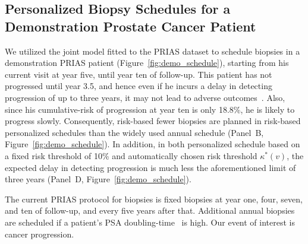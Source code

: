 \subsection{Personalized Biopsy Schedules for a Demonstration Prostate Cancer Patient}
We utilized the joint model fitted to the PRIAS dataset to schedule biopsies in a demonstration PRIAS patient (Figure~\ref{fig:demo_schedule}), starting from his current visit at year five, until year ten of follow-up. This patient has not progressed until year 3.5, and hence even if he incurs a delay in detecting progression of up to three years, it may not lead to adverse outcomes~\citep{carvalho}. Also, since his cumulative-risk of progression at year ten is only 18.8\%, he is likely to progress slowly. Consequently, risk-based fewer biopsies are planned in risk-based personalized schedules than the widely used annual schedule (Panel~B, Figure~\ref{fig:demo_schedule}). In addition, in both personalized schedule based on a fixed risk threshold of 10\% and automatically chosen risk threshold $\kappa^*(v)$, the expected delay in detecting progression is much less the aforementioned limit of three years (Panel~D, Figure~\ref{fig:demo_schedule}).

The current PRIAS protocol for biopsies is fixed biopsies at year one, four, seven, and ten of follow-up, and every five years after that. Additional annual biopsies are scheduled if a patient's PSA doubling-time~\citep{bokhorst2015compliance} is high.
Our event of interest is cancer progression.

